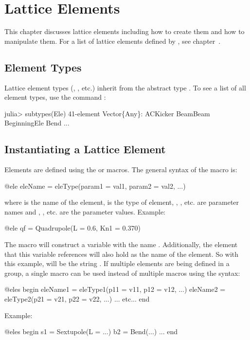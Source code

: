 \chapter{Lattice Elements}
\label{c:ele}

This chapter discusses lattice elements including how to create them and how to manipulate them.
For a list of lattice elements defined by \accellat, see chapter~. 

\section{Element Types}
\label{s:ele.types}

Lattice element types (, , etc.) inherit from the abstract 
type . To see a list of all element types, use the command :
\begin{example}
  julia> subtypes(Ele)
  41-element Vector\{Any\}:
   ACKicker
   BeamBeam
   BeginningEle
   Bend
   ...
\end{example}

\section{Instantiating a Lattice Element}
\label{s:ele.def}

Elements are defined using the  or  macros. 
The general syntax of the  macro is:
\begin{example}
  @ele eleName = eleType(param1 = val1, param2 = val2, ...)
\end{example}
where  is the name of the element,  is the type of element, 
, ,
etc. are parameter names and , , etc. are the parameter values.
Example:
\begin{example}
  @ele qf = Quadrupole(L = 0.6, Kn1 = 0.370)
\end{example}
The  macro will construct a \julia variable with the name . 
Additionally, the element
that this variable references will also hold  as the name of the element. So with this
example,  will be the string . If multiple elements are being defined in a 
group, a single
 macro can be used instead of multiple  macros using the syntax:
\begin{example}
  @eles begin
    eleName1 = eleType1(p11 = v11, p12 = v12, ...)
    eleName2 = eleType2(p21 = v21, p22 = v22, ...)
    ... etc...
  end
\end{example}
Example:
\begin{example}
  @eles begin
    s1 = Sextupole(L = ...)
    b2 = Bend(...)
    ...
  end
\end{example}

